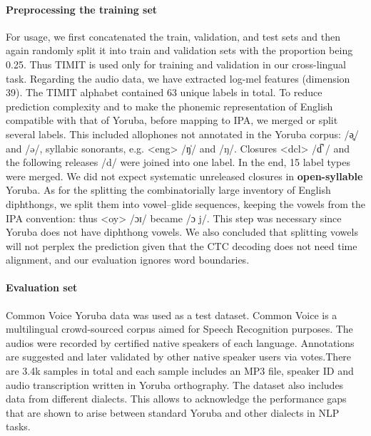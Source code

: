 \documentclass[11pt]{article}
\newcommand{\ipa}[1]{{\ipafont #1}}
\begin{document}
\paragraph{Preprocessing the training set} For usage, we first concatenated the train, validation, and test sets and then again randomly split it into train and validation sets with the proportion being 0.25. Thus TIMIT is used only for training and validation in our cross-lingual task. Regarding the audio data, we have extracted log-mel features (dimension 39). The TIMIT alphabet contained 63 unique labels in total. To reduce prediction complexity and to make the phonemic representation of English compatible with that of Yoruba, before mapping to IPA, we merged or split several labels. This included allophones not annotated in the Yoruba corpus: \ipa{<ax-h> /ə̥/} and \ipa{/ə/}, syllabic sonorants, e.g. \ipa{<eng> /ŋ̍/} and \ipa{/ŋ/}. Closures \ipa{<dcl> /d̚ /} and the following releases \ipa{/d/} were joined into one label. In the end, 15 label types were merged. We did not expect systematic unreleased closures in \textbf{open-syllable} Yoruba. \cite{Adesola2024} As for the splitting the combinatorially large inventory of English diphthongs, we split them into vowel--glide sequences, keeping the vowels from the IPA convention: thus \ipa{<oy> /ɔɪ/} became \ipa{<ao y> /ɔ j/}. This step was necessary since Yoruba does not have diphthong vowels. \citet{Przezdziecki2005} We also concluded that splitting vowels will not perplex the prediction given that the CTC decoding does not need time alignment, and our evaluation ignores word boundaries.

\paragraph{Evaluation set} Common Voice Yoruba data was used as a test dataset. Common Voice is a multilingual crowd-sourced corpus aimed for Speech Recognition purposes. \cite{Ardila2020} The audios were recorded by certified native speakers of each language. Annotations are suggested and later validated by other native speaker users via votes.There are 3.4k samples in total and each sample includes an MP3 file, speaker ID and audio transcription written in Yoruba orthography. The dataset also includes data from different dialects. This allows to acknowledge the performance gaps that are shown to arise between standard Yoruba and other dialects in NLP tasks. \citet{AhiaEtAl2024}
\end{document}
